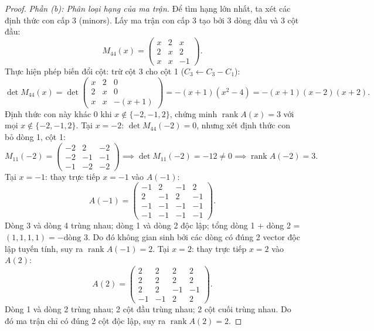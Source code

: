 \documentclass{article}
\begin{document}
\begin{proof}
\emph{Phần (b): Phân loại hạng của ma trận.}
Để tìm hạng lớn nhất, ta xét các định thức con cấp 3 (minors). Lấy ma trận con cấp 3 tạo bởi 3 dòng đầu và 3 cột đầu:
\begin{equation}
    M_{44}(x) = \begin{pmatrix}
        x & 2 & x \\
        2 & x & 2 \\
        x & x & -1
    \end{pmatrix}.
\end{equation}
Thực hiện phép biến đổi cột: trừ cột 3 cho cột 1 ($C_3 \leftarrow C_3 - C_1$):
\begin{equation}
    \det M_{44}(x) = \det \begin{pmatrix}
        x & 2 & 0 \\
        2 & x & 0 \\
        x & x & -(x + 1)
    \end{pmatrix} = -(x + 1)(x^2 - 4) = -(x + 1)(x - 2)(x + 2).
\end{equation}
Định thức con này khác 0 khi $x \notin \{-2, -1, 2\}$, chứng minh $\operatorname{rank} A(x) = 3$ với mọi $x \notin \{-2, -1, 2\}$.
Tại $x = -2$: $\det M_{44}(-2) = 0$, nhưng xét định thức con bỏ dòng 1, cột 1:
\begin{equation}
    M_{11}(-2) = \begin{pmatrix}
        -2 & 2 & -2 \\
        -2 & -1 & -1 \\
        -1 & -2 & -2
    \end{pmatrix} \implies \det M_{11}(-2) = -12 \ne 0 \implies \operatorname{rank} A(-2) = 3.
\end{equation}
Tại $x = -1$: thay trực tiếp $x = -1$ vào $A(-1)$:
\begin{equation}
    A(-1) = \begin{pmatrix}
        -1 & 2 & -1 & 2 \\
        2 & -1 & 2 & -1 \\
        -1 & -1 & -1 & -1 \\
        -1 & -1 & -1 & -1
    \end{pmatrix}.
\end{equation}
Dòng 3 và dòng 4 trùng nhau; dòng 1 và dòng 2 độc lập; tổng dòng 1 + dòng 2 = $(1, 1, 1, 1) = -\text{dòng 3}$. Do đó không gian sinh bởi các dòng có đúng 2 vector độc lập tuyến tính, suy ra $\operatorname{rank} A(-1) = 2$.
Tại $x = 2$: thay trực tiếp $x = 2$ vào $A(2)$:
\begin{equation}
    A(2) = \begin{pmatrix}
        2 & 2 & 2 & 2 \\
        2 & 2 & 2 & 2 \\
        2 & 2 & -1 & -1 \\
        -1 & -1 & 2 & 2
    \end{pmatrix}.
\end{equation}
Dòng 1 và dòng 2 trùng nhau; 2 cột đầu trùng nhau; 2 cột cuối trùng nhau. Do đó ma trận chỉ có đúng 2 cột độc lập, suy ra $\operatorname{rank} A(2) = 2$.


\end{proof}
\end{document}
